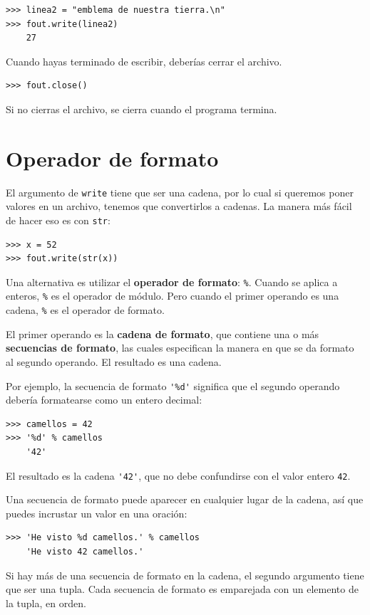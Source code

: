 \documentclass[10pt]{book}
\begin{document}
\begin{verbatim}
>>> linea2 = "emblema de nuestra tierra.\n"
>>> fout.write(linea2)
    27
\end{verbatim}
%
Cuando hayas terminado de escribir, deberías cerrar el archivo.

\begin{verbatim}
>>> fout.close()
\end{verbatim}
%
%
Si no cierras el archivo, se cierra cuando el
programa termina.


\section{Operador de formato}

El argumento de {\tt write} tiene que ser una cadena, por lo cual si queremos
poner valores en un archivo, tenemos que convertirlos a
cadenas.  La manera más fácil de hacer eso es con {\tt str}:

\begin{verbatim}
>>> x = 52
>>> fout.write(str(x))
\end{verbatim}
%
Una alternativa es utilizar el {\bf operador de formato}: {\tt \%}.  Cuando
se aplica a enteros, {\tt \%} es el operador de módulo.  Pero
cuando el primer operando es una cadena, {\tt \%} es el operador de formato.

El primer operando es la {\bf cadena de formato}, que contiene
una o más {\bf secuencias de formato}, las cuales
especifican la manera en que
se da formato al segundo operando.  El resultado es una cadena.

Por ejemplo, la secuencia de formato \verb"'%d'" significa que
el segundo operando debería formatearse como un entero
decimal:

\begin{verbatim}
>>> camellos = 42
>>> '%d' % camellos
    '42'
\end{verbatim}
%
El resultado es la cadena \verb"'42'", que no debe confundirse
con el valor entero {\tt 42}.

Una secuencia de formato puede aparecer en cualquier lugar de la cadena,
así que puedes incrustar un valor en una oración:

\begin{verbatim}
>>> 'He visto %d camellos.' % camellos
    'He visto 42 camellos.'
\end{verbatim}
%
Si hay más de una secuencia de formato en la cadena,
el segundo argumento tiene que ser una tupla.  Cada secuencia de formato es
emparejada con un elemento de la tupla, en orden.
\end{document}
